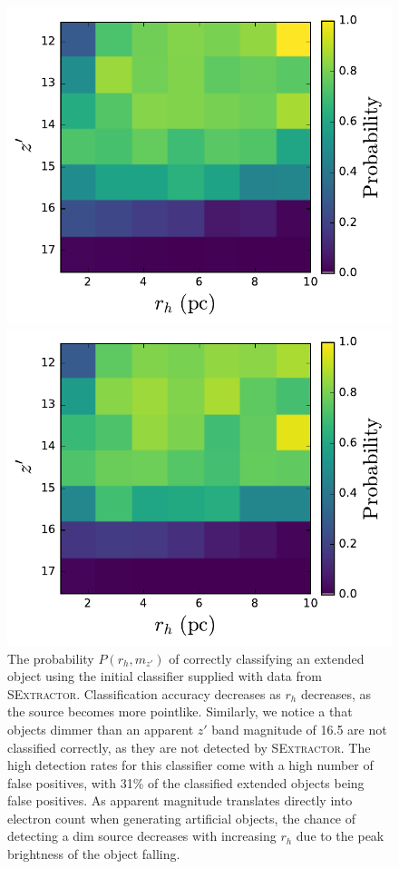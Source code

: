 \documentclass[useAMS,usenatbib]{mn2e}
\begin{document}
\begin{figure}
	\centering
	\begin{minipage}[t]{.49\textwidth}
	\includegraphics[width=\textwidth]{images/classifier_1.pdf}
	\caption{The probability $P(r_h, m_{z'})$ of correctly classifying an extended object using the initial classifier supplied with data from \textsc{SExtractor}. Classification accuracy decreases as $r_h$ decreases, as the source becomes more pointlike. Similarly, we notice a that objects dimmer than an apparent $z'$ band magnitude of 16.5 are not classified correctly, as they are not detected by \textsc{SExtractor}. The high detection rates for this classifier come with a high number of false positives, with 31\% of the classified extended objects being false positives. As apparent magnitude translates directly into electron count when generating artificial objects, the chance of detecting a dim source decreases with increasing $r_h$ due to the peak brightness of the object falling.}
	\label{fig:comp1}
	\end{minipage}\hfill
	\begin{minipage}[t]{.49\textwidth}
		\includegraphics[width=\textwidth]{images/classifier_2.pdf}

\end{minipage}
\end{figure}
\end{document}
